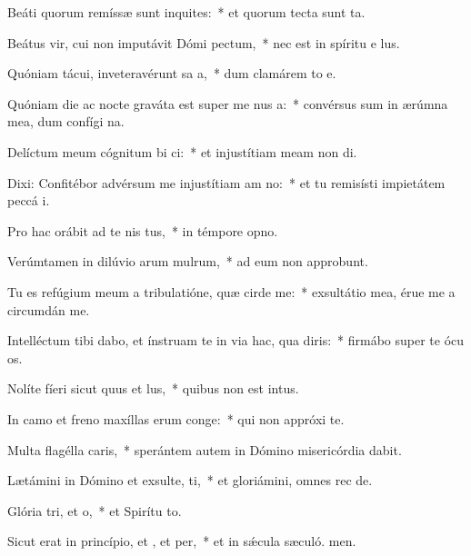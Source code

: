 \item Beáti quorum remíssæ sunt inquites:~* et quorum tecta sunt ta.
\item Beátus vir, cui non imputávit Dómi pectum,~* nec est in spíritu e lus.
\item Quóniam tácui, inveteravérunt sa a,~* dum clamárem to e.
\item Quóniam die ac nocte graváta est super me nus a:~* convérsus sum in ærúmna mea, dum confígi na.
\item Delíctum meum cógnitum bi ci:~* et injustítiam meam non di.
\item Dixi: Confitébor advérsum me injustítiam am no:~* et tu remisísti impietátem peccá i.
\item Pro hac orábit ad te nis tus,~* in témpore opno.
\item Verúmtamen in dilúvio arum mulrum,~* ad eum non approbunt.
\item Tu es refúgium meum a tribulatióne, quæ cirde me:~* exsultátio mea, érue me a circumdán me.
\item Intelléctum tibi dabo, et ínstruam te in via hac, qua diris:~* firmábo super te ócu os.
\item Nolíte fíeri sicut quus et lus,~* quibus non est intus.
\item In camo et freno maxíllas erum conge:~* qui non appróxi  te.
\item Multa flagélla caris,~* sperántem autem in Dómino misericórdia dabit.
\item Lætámini in Dómino et exsulte, ti,~* et gloriámini, omnes rec de.
\item Glória tri, et o,~* et Spirítu to.
\item Sicut erat in princípio, et , et per,~* et in sǽcula sæculó. men.
